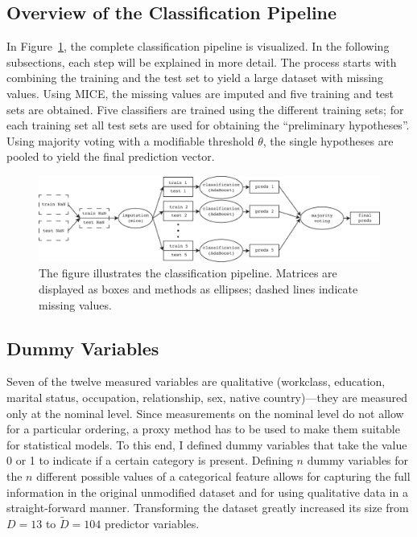 \documentclass[a4paper]{article}
\begin{document}
\subsection{Overview of the Classification Pipeline}

In Figure~\ref{fig:pipeline}, the complete classification pipeline is
visualized. In the following subsections, each step will be explained
in more detail. The process starts with combining the training and the
test set to yield a large dataset with missing values. Using MICE, the
missing values are imputed and five training and test sets are
obtained. Five classifiers are trained using the different training
sets; for each training set all test sets are used for obtaining the
``preliminary hypotheses''. Using majority voting with a modifiable
threshold $\theta$, the single hypotheses are pooled to yield the
final prediction vector.

\begin{figure}[h!]
\begin{center}
\includegraphics[width=1\columnwidth]{pipeline}
\caption{{\label{fig:pipeline} The figure illustrates the
    classification pipeline. Matrices are displayed as boxes and
    methods as ellipses; dashed lines indicate missing values.%
  }}
\end{center}
\end{figure}

\subsection{Dummy Variables}

Seven of the twelve measured variables are qualitative (workclass,
education, marital status, occupation, relationship, sex, native
country)---they are measured only at the nominal level. Since
measurements on the nominal level do not allow for a particular
ordering, a proxy method has to be used to make them suitable for
statistical models. To this end, I defined dummy variables that take
the value 0 or 1 to indicate if a certain category is
present. Defining $n$ dummy variables for the $n$ different possible
values of a categorical feature allows for capturing the full
information in the original unmodified dataset and for using
qualitative data in a straight-forward manner.
Transforming the dataset greatly increased its size from $D = 13$ to
$\tilde{D} = 104$ predictor variables.
\end{document}
